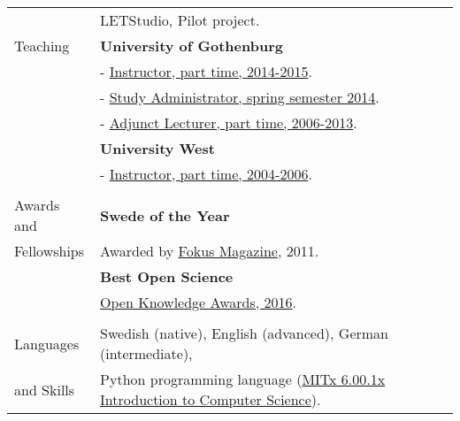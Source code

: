\documentclass[a4paper,11pt,oneside]{article}
\begin{document}
\begin{tabular}{@{} l l}
     & LETStudio, Pilot project.
     & \\
  \Large{Teaching}   & \textbf{University of Gothenburg} \\
     & - \href{http://files.christopherkullenberg.se/anstallningarGU.pdf}{Instructor, part time, 2014-2015}.\\
     & - \href{http://files.christopherkullenberg.se/studierektoronline.pdf}{Study Administrator, spring semester 2014}. \\
     & - \href{http://files.christopherkullenberg.se/anstallningarGU.pdf}{Adjunct Lecturer, part time, 2006-2013}. \\
     &\textbf{University West} \\
     & - \href{http://files.christopherkullenberg.se/universitywest.pdf}{Instructor, part time, 2004-2006}. \\
     & \\
 \Large{Awards and }    & \textbf{Swede of the Year} \\
  \Large{Fellowships}   & Awarded by \href{http://www.fokus.se/2011/12/med-datorn-som-vapen/}{Fokus Magazine}, 2011. \\
                        & \textbf{Best Open Science} \\
                        & \href{http://www.mynewsdesk.com/se/pressreleases/1st-annual-open-knowledge-awards-announces-the-winners-1684562}{Open Knowledge Awards, 2016}.\\
     & \\
  \Large{Languages}   & Swedish (native), English (advanced), German (intermediate), \\
\Large{and Skills}    & Python programming language (\href{https://courses.edx.org/certificates/f9c30b3913be4004b95813db59432509}{MITx 6.00.1x Introduction to Computer Science}).  \\
\end{tabular}


\newpage
\tableofcontents
\newpage




\end{document}
